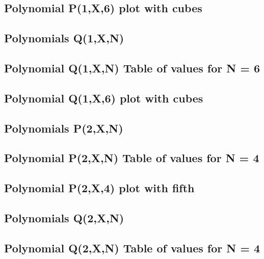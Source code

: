 \documentclass[12pt,letterpaper,oneside,reqno]{amsart}
\begin{document}
    \subsection{Polynomial P(1,X,6) plot with cubes}
    


    \subsection{Polynomials Q(1,X,N)}
    

    \subsection{Polynomial Q(1,X,N) Table of values for N = 6}
    

    \subsection{Polynomial Q(1,X,6) plot with cubes}
    


    \subsection{Polynomials P(2,X,N)}
    

    \subsection{Polynomial P(2,X,N) Table of values for N = 4}
    

    \subsection{Polynomial P(2,X,4) plot with fifth}
    


    \subsection{Polynomials Q(2,X,N)}
    

    \subsection{Polynomial Q(2,X,N) Table of values for N = 4}
    
\end{document}
